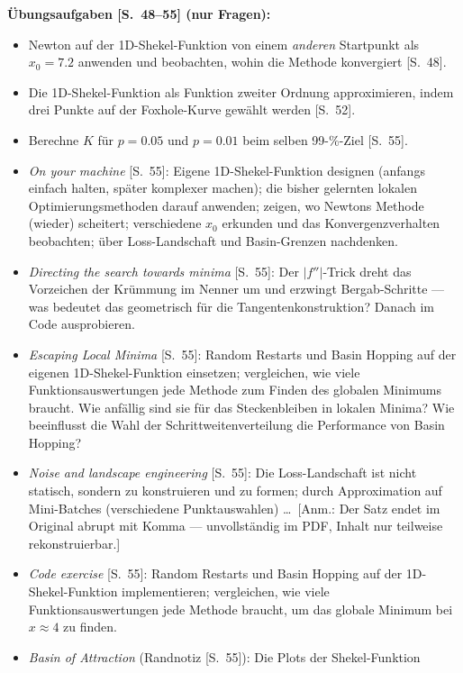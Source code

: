 \textbf{Übungsaufgaben [S.~48--55] (nur Fragen):}
\begin{itemize}[itemsep=2pt]
  \item Newton auf der 1D-Shekel-Funktion von einem \emph{anderen} Startpunkt als
        $x_0 = 7.2$ anwenden und beobachten, wohin die Methode konvergiert [S.~48].
  \item Die 1D-Shekel-Funktion als Funktion zweiter Ordnung approximieren, indem drei
        Punkte auf der Foxhole-Kurve gewählt werden [S.~52].
  \item Berechne $K$ für $p = 0.05$ und $p = 0.01$ beim selben 99-\%-Ziel [S.~55].
  \item \emph{On your machine} [S.~55]: Eigene 1D-Shekel-Funktion designen (anfangs
        einfach halten, später komplexer machen); die bisher gelernten lokalen
        Optimierungsmethoden darauf anwenden; zeigen, wo Newtons Methode (wieder)
        scheitert; verschiedene $x_0$ erkunden und das Konvergenzverhalten beobachten;
        über Loss-Landschaft und Basin-Grenzen nachdenken.
  \item \emph{Directing the search towards minima} [S.~55]: Der $|f''|$-Trick dreht
        das Vorzeichen der Krümmung im Nenner um und erzwingt Bergab-Schritte ---
        was bedeutet das geometrisch für die Tangentenkonstruktion? Danach im Code
        ausprobieren.
  \item \emph{Escaping Local Minima} [S.~55]: Random Restarts und Basin Hopping auf
        der eigenen 1D-Shekel-Funktion einsetzen; vergleichen, wie viele
        Funktionsauswertungen jede Methode zum Finden des globalen Minimums braucht.
        Wie anfällig sind sie für das Steckenbleiben in lokalen Minima? Wie
        beeinflusst die Wahl der Schrittweitenverteilung die Performance von Basin
        Hopping?
  \item \emph{Noise and landscape engineering} [S.~55]: Die Loss-Landschaft ist nicht
        statisch, sondern zu konstruieren und zu formen; durch Approximation auf
        Mini-Batches (verschiedene Punktauswahlen) \ldots\ [Anm.: Der Satz endet im
        Original abrupt mit Komma --- unvollständig im PDF, Inhalt nur teilweise
        rekonstruierbar.]
  \item \emph{Code exercise} [S.~55]: Random Restarts und Basin Hopping auf der
        1D-Shekel-Funktion implementieren; vergleichen, wie viele
        Funktionsauswertungen jede Methode braucht, um das globale Minimum bei
        $x \approx 4$ zu finden.
  \item \emph{Basin of Attraction} (Randnotiz [S.~55]): Die Plots der Shekel-Funktion

\end{itemize}
